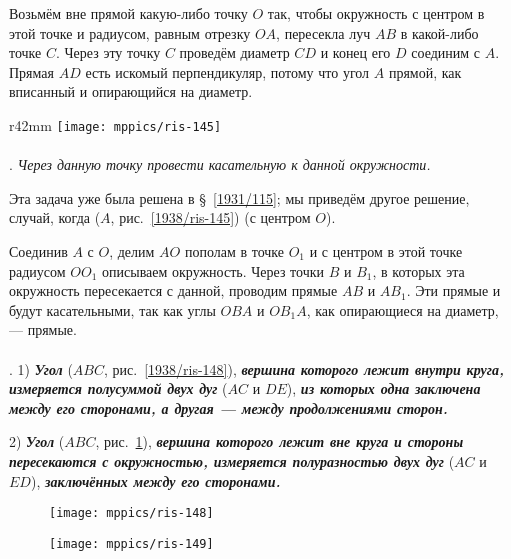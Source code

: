 Возьмём вне прямой какую-либо точку $O$ так, чтобы окружность с центром в этой точке и радиусом, равным отрезку $OA$, пересекла луч $AB$ в какой-либо точке $C$.
Через эту точку $C$ проведём диаметр $CD$ и конец его $D$ соединим с $A$.
Прямая $AD$ есть искомый перпендикуляр, потому что угол $A$ прямой, как вписанный и опирающийся на диаметр.


\begin{wrapfigure}{r}{42mm}
\centering
\texttt{[image: mppics/ris-145]}
\caption{}\label{1938/ris-145}
\end{wrapfigure}

\paragraph{}\label{1938/128}
\mbox{.}
\emph{Через данную точку провести касательную к данной окружности.}

Эта задача уже  была решена в §~\ref{1931/115};
мы приведём другое решение, случай, когда  ($A$, рис.~\ref{1938/ris-145})  (с центром $O$).

Соединив $A$ с $O$, делим $AO$ пополам в точке $O_1$ и с центром в этой точке радиусом $OO_1$ описываем окружность.
Через точки $B$ и $B_1$, в которых эта окружность пересекается с данной, проводим прямые $AB$ и $AB_1$.
Эти прямые и будут касательными, так как углы $OBA$ и $OB_1A$, как опирающиеся на диаметр, — прямые.




\paragraph{}\label{1938/130}
.
1) \textbf{\emph{Угол}} ($ABC$, рис.~\ref{1938/ris-148}), \textbf{\emph{вершина которого лежит внутри круга, измеряется полусуммой двух дуг}} ($AC$ и $DE$), \textbf{\emph{из которых одна заключена между его сторонами, а другая — между продолжениями сторон.}}

2) \textbf{\emph{Угол}} ($ABC$, рис.~\ref{1938/ris-149}), \textbf{\emph{вершина которого лежит вне круга и стороны пересекаются с окружностью, измеряется полуразностью двух дуг}} ($AC$ и $ED$), \textbf{\emph{заключённых между его сторонами.}}

\begin{figure}[h]
\begin{minipage}{.48\textwidth}
\centering
\texttt{[image: mppics/ris-148]}
\end{minipage}
\hfill
\begin{minipage}{.48\textwidth}
\centering
\texttt{[image: mppics/ris-149]}
\end{minipage}

\medskip

\begin{minipage}{.48\textwidth}
\centering
\caption{}\label{1938/ris-148}
\end{minipage}
\hfill
\begin{minipage}{.48\textwidth}
\centering
\caption{}\label{1938/ris-149}
\end{minipage}
\vskip-4mm
\end{figure}

